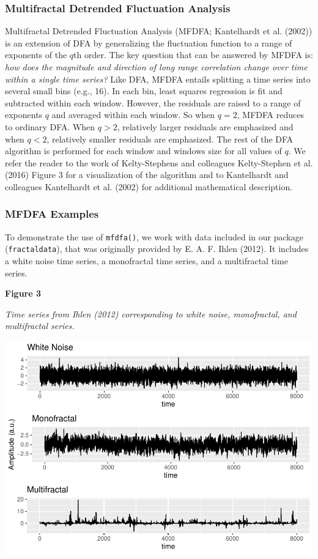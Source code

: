 \documentclass[
  man]{apa6}
\begin{document}
\hypertarget{multifractal-detrended-fluctuation-analysis}{%
\subsubsection{Multifractal Detrended Fluctuation Analysis}\label{multifractal-detrended-fluctuation-analysis}}

Multifractal Detrended Fluctuation Analysis (MFDFA;
Kantelhardt et al. (2002)) is an extension of DFA
by generalizing the fluctuation function to a range of exponents of the
\(q\)th order. The key question that can be answered by MFDFA is: \emph{how
does the magnitude and direction of long range correlation change over
time within a single time series?} Like DFA, MFDFA entails splitting a
time series into several small bins (e.g., 16). In each bin, least
squares regression is fit and subtracted within each window. However,
the residuals are raised to a range of exponents \(q\) and averaged within
each window. So when \(q = 2\), MFDFA reduces to ordinary DFA. When
\(q >2\), relatively larger residuals are emphasized and when \(q < 2\),
relatively smaller residuals are emphasized. The rest of the DFA
algorithm is performed for each window and windows size for all values
of \(q\). We refer the reader to the work of Kelty-Stephens and colleagues
Kelty-Stephen et al. (2016) Figure 3 for a
visualization of the algorithm and to Kantelhardt and colleagues
Kantelhardt et al. (2002) for additional
mathematical description.

\hypertarget{mfdfa-examples}{%
\subsubsection{MFDFA Examples}\label{mfdfa-examples}}

To demonstrate the use of \texttt{mfdfa()}, we work with data included in our
package (\texttt{fractaldata}), that was originally provided by
E. A. F. Ihlen (2012). It includes a white noise
time series, a monofractal time series, and a multifractal time series.

\textbf{Figure 3}

\emph{Time series from Ihlen (2012) corresponding to white noise,
monofractal, and multifractal series.}

\includegraphics{fractal_regression_paper_brm_files/figure-latex/unnamed-chunk-8-1.pdf}
\end{document}
